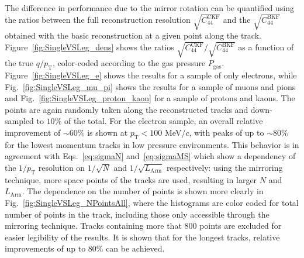 The difference in performance due to the mirror rotation can be quantified using the ratios between the full reconstruction resolution $\sqrt{C_{44}^{\textrm{CKF}}}$ and the $\sqrt{C_{44}^{\text{BKF}}}$ obtained with the basic reconstruction at a given point along the track. Figure~\ref{fig:SingleVSLeg_dens} shows the ratios $\sqrt{C_{44}^{\textrm{CKF}}}/\sqrt{C_{44}^{\text{BKF}}}$ as a function of the true $q/p_{\text{T}}$, color-coded according to the gas pressure $P_{\textrm{gas}}$. Figure~\ref{fig:SingleVSLeg_e} shows the results for a sample of only electrons, while Fig.~\ref{fig:SingleVSLeg_mu_pi} shows the results for a sample of muons and pions and Fig.~\ref{fig:SingleVSLeg_proton_kaon} for a sample of protons and kaons. The points are again randomly taken along the reconstructed tracks and down-sampled to $10\%$ of the total. For the electron sample, an overall relative improvement of $\sim 60\%$ is shown at $p_{\text{T}}<100$ MeV/$c$, with peaks of up to $\sim 80\%$ for the lowest momentum tracks in low pressure environments. This behavior is in agreement with Eqs.~\ref{eq:sigmaN} and~\ref{eq:sigmaMS} which show a dependency of the $1/p_{\text{T}}$ resolution on $1/\sqrt{N}$ and $1/\sqrt{L_\textrm{Arm}}$ respectively: using the mirroring technique, more space points of the tracks are used, resulting in larger $N$ and $L_\textrm{Arm}$. The dependence on the number of points is shown more clearly in Fig.~\ref{fig:SingleVSLeg_NPointsAll}, where the histograms are color coded for total number of points in the track, including those only accessible through the mirroring technique. Tracks containing more that 800 points are excluded for easier legibility of the results. It is shown that for the longest tracks, relative improvements of up to 80\% can be achieved. 


